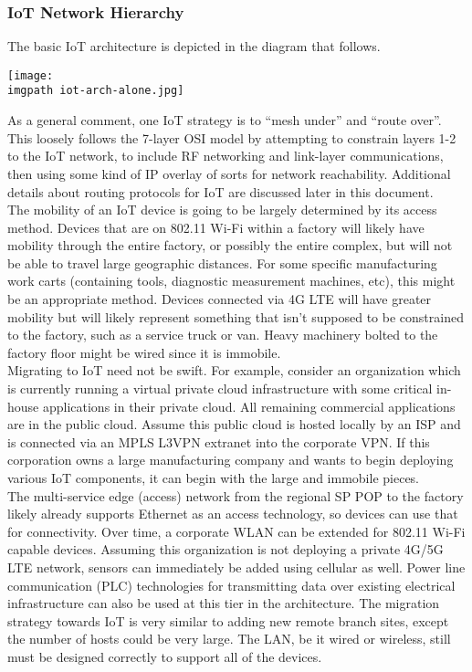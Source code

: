 \subsubsection{IoT Network Hierarchy}
The basic IoT architecture is depicted in the diagram that follows.

    \begin{minipage}[t]{\linewidth}
	  \centering
      \texttt{[image: \\imgpath iot-arch-alone.jpg]}
    \end{minipage}

As a general comment, one IoT strategy is to ``mesh under'' and ``route
over''. This loosely follows the 7-layer OSI model by attempting to constrain
layers 1-2 to the IoT network, to include RF networking and link-layer
communications, then using some kind of IP overlay of sorts for network
reachability. Additional details about routing protocols for IoT are discussed
later in this document. \\

The mobility of an IoT device is going to be largely determined by its access
method. Devices that are on 802.11 Wi-Fi within a factory will likely have
mobility through the entire factory, or possibly the entire complex, but will
not be able to travel large geographic distances. For some specific
manufacturing work carts (containing tools, diagnostic measurement machines,
etc), this might be an appropriate method. Devices connected via 4G LTE will
have greater mobility but will likely represent something that isn’t supposed
to be constrained to the factory, such as a service truck or van. Heavy
machinery bolted to the factory floor might be wired since it is immobile. \\

Migrating to IoT need not be swift. For example, consider an organization
which is currently running a virtual private cloud infrastructure with some
critical in-house applications in their private cloud. All remaining
commercial applications are in the public cloud. Assume this public cloud is
hosted locally by an ISP and is connected via an MPLS L3VPN extranet into the
corporate VPN. If this corporation owns a large manufacturing company and
wants to begin deploying various IoT components, it can begin with the large
and immobile pieces. \\

The multi-service edge (access) network from the regional SP POP to the
factory likely already supports Ethernet as an access technology, so devices
can use that for connectivity. Over time, a corporate WLAN can be extended for
802.11 Wi-Fi capable devices. Assuming this organization is not deploying a
private 4G/5G LTE network, sensors can immediately be added using cellular as
well. Power line communication (PLC) technologies for transmitting data over
existing electrical infrastructure can also be used at this tier in the
architecture. The migration strategy towards IoT is very similar to adding new
remote branch sites, except the number of hosts could be very large. The LAN,
be it wired or wireless, still must be designed correctly to support all of
the devices. \\

